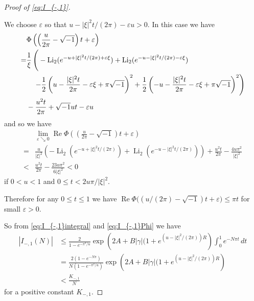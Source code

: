 \documentclass[a4paper]{amsart}
\theoremstyle{plain}
\theoremstyle{definition}
\theoremstyle{remark}
\newcommand{\Li}{\operatorname{Li}}
\renewcommand{\Re}{\operatorname{Re}}
\numberwithin{equation}{section}
\begin{document}
\begin{proof}[Proof of \eqref{eq:I_{-,1}}]
\begin{itemize}
We choose $\varepsilon$ so that $u-|\xi|^2t/(2\pi)-\varepsilon u>0$.
In this case we have
\begin{equation*}
\begin{split}
  &\Phi\left(\left(\frac{u}{2\pi}-\sqrt{-1}\right)t+\varepsilon\right)
  \\
  =&
  \frac{1}{\xi}
  \left(
    \vphantom{\left(\frac{|\xi|^2t}{2\pi}\right)^2}
    -
    \Li_2(e^{-u+|\xi|^2t/(2\pi)+\varepsilon\xi})
    +
    \Li_2(e^{-u-|\xi|^2t/(2\pi)-\varepsilon\xi})
  \right.
  \\
  &\left.\quad
    -\frac{1}{2}
    \left(
      u-\frac{|\xi|^2t}{2\pi}-\varepsilon\xi+\pi\sqrt{-1}
    \right)^2
    +\frac{1}{2}
    \left(
      -u-\frac{|\xi|^2t}{2\pi}-\varepsilon\xi+\pi\sqrt{-1}
    \right)^2
  \right)
  \\
  &-
  \frac{u^2t}{2\pi}+\sqrt{-1}ut-\varepsilon u
\end{split}
\end{equation*}
and so we have
\begin{equation*}
\begin{split}
  &\lim_{\varepsilon\searrow0}
  \Re\Phi\left(\left(\frac{u}{2\pi}-\sqrt{-1}\right)t+\varepsilon\right)
  \\
  =&
  \frac{u}{|\xi|^2}
  \left(
    -
    \Li_2(e^{-u+|\xi|^2t/(2\pi)})
    +
    \Li_2(e^{-u-|\xi|^2t/(2\pi)})
  \right)
  +\frac{u^2t}{2\pi}-\frac{4u\pi^2}{|\xi|^2}
  \\
  <&
  \frac{u^2t}{2\pi}-\frac{23u\pi^2}{6|\xi|^2}
  <0
\end{split}
\end{equation*}
if $0<u<1$ and $0\le t<2u\pi/|\xi|^2$.
\end{itemize}
Therefore for any $0\le t\le1$ we have $\Re\Phi\bigl((u/(2\pi)-\sqrt{-1})t+\varepsilon\bigr)\le\pi t$ for small $\varepsilon>0$.
\par
So from \eqref{eq:I_{-,1}integral} and \eqref{eq:I_{-,1}Phi} we have
\begin{equation*}
\begin{split}
  \left|I_{-,1}(N)\right|
  &\le
  \frac{2}{1-e^{-\pi^2/u}}
  \exp\left(2A+B|\gamma|(1+e^{(u-|\xi|^2/(2\pi))R}\right)
  \int_{0}^{1}e^{-N\pi t}\,dt
  \\
  &=
  \frac{2(1-e^{-N\pi})}{N(1-e^{-\pi^2/u})}
  \exp\left(2A+B|\gamma|(1+e^{(u-|\xi|^2/(2\pi))R}\right)
  \\
  &<
  \frac{K_{-,1}}{N}
\end{split}
\end{equation*}
for a positive constant $K_{-,1}$.
\end{proof}%
\end{document}
